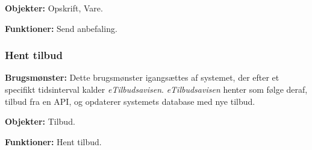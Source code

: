 \textbf{Objekter:} Opskrift, Vare.

\textbf{Funktioner:} Send anbefaling.

\subsubsection*{Hent tilbud}
\textbf{Brugsmønster:} Dette brugsmønster igangsættes af systemet, der efter et specifikt tidsinterval kalder \textit{eTilbudsavisen}.
\textit{eTilbudsavisen} henter som følge deraf, tilbud fra en API, og opdaterer systemets database med nye tilbud.

\textbf{Objekter:} Tilbud.

\textbf{Funktioner:} Hent tilbud.